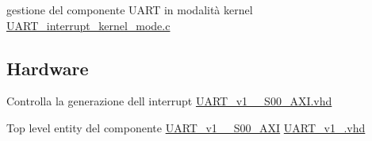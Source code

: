 \begin{DoxyItemize}
\item gestione del componente U\+A\+RT in modalità kernel \hyperlink{UART__interrupt__kernel__mode_8c}{U\+A\+R\+T\+\_\+interrupt\+\_\+kernel\+\_\+mode.\+c} 
\end{DoxyItemize}\hypertarget{index_Hardware}{}\subsection{Hardware}\label{index_Hardware}

\begin{DoxyItemize}
\item Controlla la generazione dell\textquotesingle{} interrupt \hyperlink{UART__v1__0__S00__AXI_8vhd}{U\+A\+R\+T\+\_\+v1\+\_\+\_\+\+S00\+\_\+\+A\+X\+I.\+vhd}
\item Top level entity del componente \hyperlink{classUART__v1__0__S00__AXI}{U\+A\+R\+T\+\_\+v1\+\_\+\_\+\+S00\+\_\+\+A\+XI} \hyperlink{UART__v1__0_8vhd}{U\+A\+R\+T\+\_\+v1\+\_.\+vhd} 
\end{DoxyItemize}